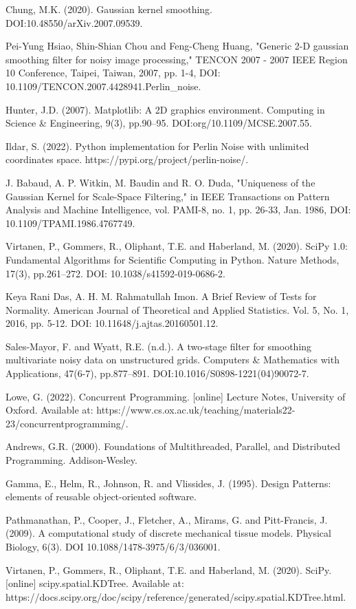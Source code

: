 \documentclass[11pt,a4paper]{article}
\begin{document}
\begin{thebibliography}{9}
Chung, M.K. (2020). Gaussian kernel smoothing. DOI:10.48550/arXiv.2007.09539.

Pei-Yung Hsiao, Shin-Shian Chou and Feng-Cheng Huang, "Generic 2-D gaussian smoothing filter for noisy image processing," TENCON 2007 - 2007 IEEE Region 10 Conference, Taipei, Taiwan, 2007, pp. 1-4, DOI: 10.1109/TENCON.2007.4428941.Perlin\_noise.

Hunter, J.D. (2007). Matplotlib: A 2D graphics environment. Computing in Science \& Engineering, 9(3), pp.90–95. DOI:org/10.1109/MCSE.2007.55.

Ildar, S. (2022). Python implementation for Perlin Noise with unlimited coordinates space. https://pypi.org/project/perlin-noise/.

J. Babaud, A. P. Witkin, M. Baudin and R. O. Duda, "Uniqueness of the Gaussian Kernel for Scale-Space Filtering," in IEEE Transactions on Pattern Analysis and Machine Intelligence, vol. PAMI-8, no. 1, pp. 26-33, Jan. 1986, DOI: 10.1109/TPAMI.1986.4767749.

Virtanen, P., Gommers, R., Oliphant, T.E. and Haberland, M. (2020). SciPy 1.0: Fundamental Algorithms for Scientific Computing in Python. Nature Methods, 17(3), pp.261–272. DOI: 10.1038/s41592-019-0686-2.

Keya Rani Das, A. H. M. Rahmatullah Imon. A Brief Review of Tests for Normality. American Journal of Theoretical and Applied Statistics. Vol. 5, No. 1, 2016, pp. 5-12. DOI: 10.11648/j.ajtas.20160501.12.

Sales-Mayor, F. and Wyatt, R.E. (n.d.). A two-stage filter for smoothing multivariate noisy data on unstructured grids. Computers \& Mathematics with Applications, 47(6-7), pp.877–891. DOI:10.1016/S0898-1221(04)90072-7.

Lowe, G. (2022). Concurrent Programming. [online] Lecture Notes, University of Oxford. Available at: https://www.cs.ox.ac.uk/teaching/materials22-23/concurrentprogramming/.

Andrews, G.R. (2000). Foundations of Multithreaded, Parallel, and Distributed Programming. Addison-Wesley.

Gamma, E., Helm, R., Johnson, R. and Vlissides, J. (1995). Design Patterns: elements of reusable object-oriented software.

Pathmanathan, P., Cooper, J., Fletcher, A., Mirams, G. and Pitt-Francis, J. (2009). A computational study of discrete mechanical tissue models. Physical Biology, 6(3). DOI 10.1088/1478-3975/6/3/036001.

Virtanen, P., Gommers, R., Oliphant, T.E. and Haberland, M. (2020). SciPy. [online] scipy.spatial.KDTree. Available at: https://docs.scipy.org/doc/scipy/reference/generated/scipy.spatial.KDTree.html.

\end{thebibliography}
\end{document}
